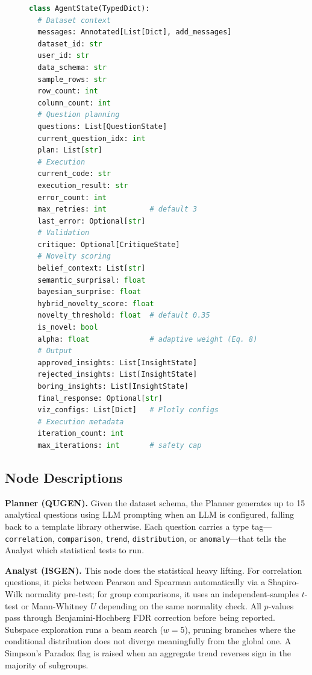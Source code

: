 \documentclass[conference]{IEEEtran}
\begin{document}
\begin{figure}[!t]
\begin{lstlisting}[language=Python,
  caption={AgentState TypedDict (condensed)},
  label={lst:state}]
class AgentState(TypedDict):
  # Dataset context
  messages: Annotated[List[Dict], add_messages]
  dataset_id: str
  user_id: str
  data_schema: str
  sample_rows: str
  row_count: int
  column_count: int
  # Question planning
  questions: List[QuestionState]
  current_question_idx: int
  plan: List[str]
  # Execution
  current_code: str
  execution_result: str
  error_count: int
  max_retries: int          # default 3
  last_error: Optional[str]
  # Validation
  critique: Optional[CritiqueState]
  # Novelty scoring
  belief_context: List[str]
  semantic_surprisal: float
  bayesian_surprise: float
  hybrid_novelty_score: float
  novelty_threshold: float  # default 0.35
  is_novel: bool
  alpha: float              # adaptive weight (Eq. 8)
  # Output
  approved_insights: List[InsightState]
  rejected_insights: List[InsightState]
  boring_insights: List[InsightState]
  final_response: Optional[str]
  viz_configs: List[Dict]   # Plotly configs
  # Execution metadata
  iteration_count: int
  max_iterations: int       # safety cap
\end{lstlisting}
\end{figure}

\subsection{Node Descriptions}

\textbf{Planner (QUGEN).} Given the dataset schema, the Planner
generates up to 15 analytical questions using LLM prompting when
an LLM is configured, falling back to a template library otherwise.
Each question carries a type tag---\texttt{correlation},
\texttt{comparison}, \texttt{trend}, \texttt{distribution}, or
\texttt{anomaly}---that tells the Analyst which statistical tests
to run.

\textbf{Analyst (ISGEN).} This node does the statistical heavy
lifting. For correlation questions, it picks between Pearson and
Spearman automatically via a Shapiro-Wilk normality pre-test;
for group comparisons, it uses an independent-samples $t$-test or
Mann-Whitney $U$ depending on the same normality check. All
$p$-values pass through Benjamini-Hochberg FDR correction
\cite{benjamini1995controlling} before being reported. Subspace
exploration runs a beam search ($w=5$), pruning branches where
the conditional distribution does not diverge meaningfully from
the global one. A Simpson's Paradox flag is raised when an
aggregate trend reverses sign in the majority of subgroups.
\end{document}

